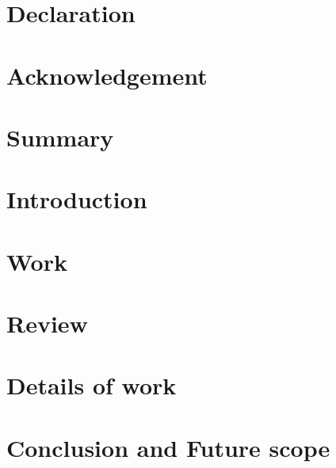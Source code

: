 \documentclass[12pt]{report}
\begin{document}




\chapter*{Declaration}


\chapter*{Acknowledgement}



\tableofcontents
\listoffigures

\clearpage
{}

\chapter{Summary}

\chapter{Introduction}

\chapter{Work}

\chapter{Review}

\chapter{Details of work}

\chapter{Conclusion and Future scope}

\begin{thebibliography}{9}
    
\end{thebibliography}
\end{document}
